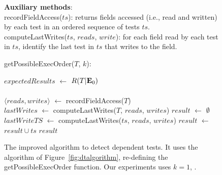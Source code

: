 
\begin{figure}[t]
\textbf{Auxiliary methods}:\\
recordFieldAccess($ts$): returns fields accessed (i.e., read and written) by each test in an ordered sequence of tests $ts$. \\
computeLastWrites($ts$, $reads$, $write$): for each field read by each test in $ts$, identify the last test in $ts$ that writes to the field.\\

\vspace{-2mm}

getPossibleExecOrder($T$, $k$):\\
\vspace{-5mm}
\begin{algorithmic}[1]
\STATE $\mathit{expectedResults}$ $\leftarrow$ $R(T|\mathbf{E}_0)$\\
\\
\STATE $\langle reads, writes\rangle$ $\leftarrow$ recordFieldAccess($T$)
\\
\STATE $\mathit{lastWrites}$ $\leftarrow$ computeLastWrites($T$, $\mathit{reads}$, $\mathit{writes}$)
\STATE $\mathit{result}$ $\leftarrow$ $\emptyset$
\STATE $\mathit{lastWriteTS}$ $\leftarrow$ computeLastWrites($ts$, $\mathit{reads}$, $\mathit{writes}$)
\vspace{-3mm}
\STATE $\mathit{result}$ $\leftarrow$ $\mathit{result} \cup \mathit{ts}$
\ENDIF
\ENDFOR
\RETURN $\mathit{result}$
\end{algorithmic}

\vspace{-3mm}
\caption {The improved algorithm to detect dependent tests.
It uses the algorithm of Figure~\ref{fig:dtalgorithm}, re-defining the
getPossibleExecOrder function.
Our experiments uses $k=1$, . } 
\label{fig:impralg}
\end{figure}

